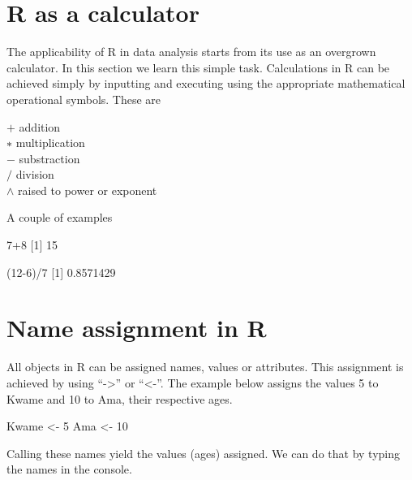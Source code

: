 \documentclass[
]{book}
\newenvironment{Shaded}{\begin{snugshade}}{\end{snugshade}}
\newcommand{\DecValTok}[1]{\textcolor[rgb]{0.00,0.00,0.81}{#1}}
\newcommand{\FloatTok}[1]{\textcolor[rgb]{0.00,0.00,0.81}{#1}}
\newcommand{\NormalTok}[1]{#1}
\newcommand{\OtherTok}[1]{\textcolor[rgb]{0.56,0.35,0.01}{#1}}
\newcommand{\SpecialCharTok}[1]{\textcolor[rgb]{0.00,0.00,0.00}{#1}}
\theoremstyle{definition}
\theoremstyle{definition}
\theoremstyle{definition}
\theoremstyle{definition}
\theoremstyle{remark}
\begin{document}
\hypertarget{r-as-a-calculator}{%
\section{R as a calculator}\label{r-as-a-calculator}}

The applicability of R in data analysis starts from its use as an overgrown
calculator. In this section we learn this simple task. Calculations in R can be
achieved simply by inputting and executing using the appropriate mathematical
operational symbols. These are

\(+\) addition\\
\(∗\) multiplication\\
\(−\) substraction\\
\(/\) division\\
\(∧\) raised to power or exponent

A couple of examples

\begin{Shaded}
\begin{Highlighting}[]
\DecValTok{7}\SpecialCharTok{+}\DecValTok{8}
\NormalTok{[}\DecValTok{1}\NormalTok{] }\DecValTok{15}

\NormalTok{(}\DecValTok{12{-}6}\NormalTok{)}\SpecialCharTok{/}\DecValTok{7}
\NormalTok{[}\DecValTok{1}\NormalTok{] }\FloatTok{0.8571429}
\end{Highlighting}
\end{Shaded}

\hypertarget{name-assignment-in-r}{%
\section{Name assignment in R}\label{name-assignment-in-r}}

All objects in R can be assigned names, values or attributes. This assignment
is achieved by using ``-\textgreater{}'' or ``\textless-''. The example below assigns the values 5 to
Kwame and 10 to Ama, their respective ages.

\begin{Shaded}
\begin{Highlighting}[]
\NormalTok{Kwame }\OtherTok{\textless{}{-}} \DecValTok{5}
\NormalTok{Ama }\OtherTok{\textless{}{-}} \DecValTok{10}
\end{Highlighting}
\end{Shaded}

Calling these names yield the values (ages) assigned. We can do that by typing
the names in the console.
\end{document}
